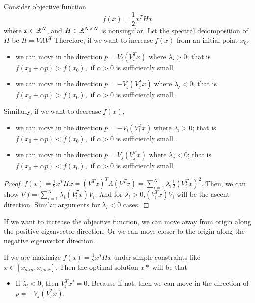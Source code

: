 \begin{refsection}
\begin{lemma}
	Consider objective function $$f(x) = \frac{1}{2}x^THx$$
where $x\in \mathbb{R}^N$, and $H\in \mathbb{R}^{N\times N}$ is nonsingular. 
Let the spectral decomposition of $H$ be $H = V\Lambda V^T$
Therefore, if we want to increase $f(x)$ from an initial point $x_0$, 
\begin{itemize}
	\item we can move in the direction $p=V_i(V_i^Tx)$ where $\lambda_i > 0$; that is $f(x_0 + \alpha p) > f(x_0),$ if $ \alpha > 0$ is sufficiently small.
	\item we can move in the direction $p=-V_j(V_j^Tx)$ where $\lambda_j <0$;
	that is $f(x_0 + \alpha p) > f(x_0),$ if $ \alpha > 0$ is sufficiently small. 
\end{itemize}
Similarly, if we want to decrease $f(x)$,
\begin{itemize}
	\item we can move in the direction $p=-V_i(V_i^Tx)$ where $\lambda_i > 0$; that is $f(x_0 + \alpha p) < f(x_0),$ if $ \alpha > 0$ is sufficiently small..
	\item we can move in the direction $p=V_j(V_j^Tx)$ where $\lambda_j <0$;
	that is $f(x_0 + \alpha p) < f(x_0),$ if $ \alpha > 0$ is sufficiently small. 
\end{itemize}
\end{lemma}
\begin{proof}
	$f(x) =\frac{1}{2} x^THx = (V^Tx)^T\Lambda (V^Tx) = \sum_{i=1}^N \lambda_i \frac{1}{2}(V_i^Tx)^2$. Then, we can show $\nabla f = \sum_{i=1}^N \lambda_i (V_i^T x) V_i $. And for $\lambda_i > 0$,$(V_i^T x) V_i$ will be the ascent direction. Similar arguments for $\lambda_i < 0$ cases. 
\end{proof}

\begin{remark}[interpretation]
If we want to increase the objective function, we can move away from origin along the positive eigenvector direction. Or we can move closer to the origin along the negative eigenvector direction.
\end{remark}


\begin{remark}
If we are maximize $f(x)=\frac{1}{2} x^THx$ under simple constraints like $x\in [x_{min},x_{max}]$. Then the optimal solution $x*$ will be that
\begin{itemize}
	\item If $\lambda_i < 0$, then $V^T_i x^* = 0.$ Because if not, then we can move in the direction of $p=-V_j(V_j^Tx)$.
\end{itemize}
\end{remark}



\end{refsection}
